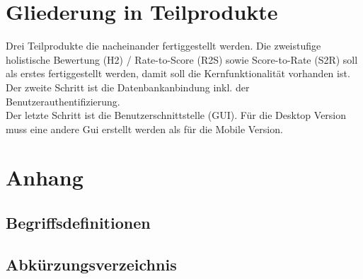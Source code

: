 \documentclass[a4paper,listof=leveldown,listof=numbered]{scrreprt}
\begin{document}
	
\chapter{Gliederung in Teilprodukte}
	Drei Teilprodukte die nacheinander fertiggestellt werden. Die zweistufige holistische Bewertung (H2) / Rate-to-Score (R2S) sowie Score-to-Rate (S2R) soll als erstes fertiggestellt werden, damit soll die Kernfunktionalität vorhanden ist. \\
	Der zweite Schritt ist die Datenbankanbindung inkl. der Benutzerauthentifizierung.\\
	Der letzte Schritt ist die Benutzerschnittstelle (GUI). Für die Desktop Version muss eine andere Gui erstellt werden als für die Mobile Version.



\newpage
\appendix

\setcounter{page}{1}
\renewcommand{\thepage}{\arabic{page}}

\chapter{Anhang}
\appendix
	\section{Begriffsdefinitionen}

	\section{Abkürzungsverzeichnis}
		\begin{acronym} 
		\end{acronym}
	
\end{document}
